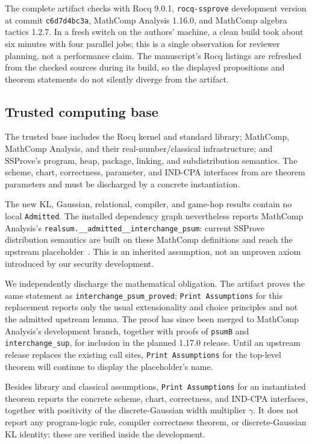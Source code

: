 The complete artifact checks with Rocq 9.0.1, \texttt{rocq-ssprove}
development version at commit \texttt{c6d7d4bc3a}, MathComp Analysis 1.16.0,
and MathComp algebra tactics 1.2.7.  In a fresh switch on the authors' machine,
a clean build took about six minutes with four parallel jobs; this is a single
observation for reviewer planning, not a performance claim.  The manuscript's
Rocq listings are refreshed from the checked sources during its build, so the
displayed propositions and theorem statements do not silently diverge from
the artifact.

\subsection{Trusted computing base}
\label{sec:tcb}

The trusted base includes the Rocq kernel and standard library; MathComp,
MathComp Analysis, and their real-number/classical infrastructure; and
SSProve's program, heap, package, linking, and subdistribution semantics.
The scheme, chart, correctness, parameter, and IND-CPA interfaces from
 are theorem parameters and must be discharged by a
concrete instantiation.

The new KL, Gaussian, relational, compiler, and game-hop results contain no
local \texttt{Admitted}.  The installed dependency graph nevertheless reports
MathComp Analysis's
\texttt{realsum.\_\_admitted\_\_interchange\_psum}: current SSProve
distribution semantics are built on these MathComp definitions and reach the
upstream placeholder~\cite{ssprove}.  This is an inherited assumption, not an
unproven axiom introduced by our security development.

We independently discharge the mathematical obligation.  The artifact proves
the same statement as \texttt{interchange\_psum\_proved};
\texttt{Print Assumptions} for this replacement reports only the usual
extensionality and choice principles and not the admitted upstream lemma.  The
proof has since been merged to MathComp Analysis's development branch,
together with proofs of \texttt{psumB} and \texttt{interchange\_sup}, for
inclusion in the planned 1.17.0 release.  Until an upstream release replaces
the existing call sites, \texttt{Print Assumptions} for the top-level theorem
will continue to display the placeholder's name.

Besides library and classical assumptions, \texttt{Print Assumptions} for an
instantiated theorem reports the concrete scheme, chart, correctness, and
IND-CPA interfaces, together with positivity of the discrete-Gaussian width
multiplier \(\gamma\).  It does not report any program-logic rule, compiler
correctness theorem, or discrete-Gaussian KL identity: these are verified
inside the development.

